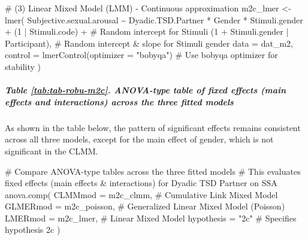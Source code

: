 \documentclass[
  bookmarksnumbered]{article}
\newenvironment{Shaded}{\begin{snugshade}}{\end{snugshade}}
\newcommand{\AttributeTok}[1]{\textcolor[rgb]{0.80,0.80,0.80}{#1}}
\newcommand{\CommentTok}[1]{\textcolor[rgb]{0.50,0.62,0.50}{#1}}
\newcommand{\DecValTok}[1]{\textcolor[rgb]{0.86,0.86,0.80}{#1}}
\newcommand{\FunctionTok}[1]{\textcolor[rgb]{0.94,0.94,0.56}{#1}}
\newcommand{\NormalTok}[1]{\textcolor[rgb]{0.80,0.80,0.80}{#1}}
\newcommand{\OtherTok}[1]{\textcolor[rgb]{0.94,0.94,0.56}{#1}}
\newcommand{\SpecialCharTok}[1]{\textcolor[rgb]{0.86,0.64,0.64}{#1}}
\newcommand{\StringTok}[1]{\textcolor[rgb]{0.80,0.58,0.58}{#1}}
\begin{document}
\begin{Shaded}
\begin{Highlighting}[]
\CommentTok{\# (3) Linear Mixed Model (LMM) {-} Continuous approximation}
\NormalTok{m2c\_lmer }\OtherTok{\textless{}{-}} \FunctionTok{lmer}\NormalTok{(}
\NormalTok{  Subjective.sexual.arousal }\SpecialCharTok{\textasciitilde{}}\NormalTok{ Dyadic.TSD.Partner }\SpecialCharTok{*}\NormalTok{ Gender }\SpecialCharTok{*}\NormalTok{ Stimuli.gender }\SpecialCharTok{+}
\NormalTok{    (}\DecValTok{1} \SpecialCharTok{|}\NormalTok{ Stimuli.code) }\SpecialCharTok{+} \CommentTok{\# Random intercept for Stimuli}
\NormalTok{    (}\DecValTok{1} \SpecialCharTok{+}\NormalTok{ Stimuli.gender }\SpecialCharTok{|}\NormalTok{ Participant), }\CommentTok{\# Random intercept \& slope for Stimuli gender}
  \AttributeTok{data =}\NormalTok{ dat\_m2,}
  \AttributeTok{control =} \FunctionTok{lmerControl}\NormalTok{(}\AttributeTok{optimizer =} \StringTok{"bobyqa"}\NormalTok{) }\CommentTok{\# Use \textquotesingle{}bobyqa\textquotesingle{} optimizer for stability}
\NormalTok{)}
\end{Highlighting}
\end{Shaded}

\subparagraph{Table \ref{tab:tab-robu-m2c}. ANOVA-type table of fixed effects (main effects and interactions) across the three fitted models}\label{table-reftabtab-robu-m2c.-anova-type-table-of-fixed-effects-main-effects-and-interactions-across-the-three-fitted-models}

As shown in the table below, the pattern of significant effects remains consistent across all three models, except for the main effect of gender, which is not significant in the CLMM.

\begin{Shaded}
\begin{Highlighting}[]
\CommentTok{\# Compare ANOVA{-}type tables across the three fitted models}
\CommentTok{\# This evaluates fixed effects (main effects \& interactions) for Dyadic TSD Partner on SSA}
\FunctionTok{anova.comp}\NormalTok{(}
  \AttributeTok{CLMMmod =}\NormalTok{ m2c\_clmm, }\CommentTok{\# Cumulative Link Mixed Model}
  \AttributeTok{GLMERmod =}\NormalTok{ m2c\_poisson, }\CommentTok{\# Generalized Linear Mixed Model (Poisson)}
  \AttributeTok{LMERmod =}\NormalTok{ m2c\_lmer, }\CommentTok{\# Linear Mixed Model}
  \AttributeTok{hypothesis =} \StringTok{"2c"} \CommentTok{\# Specifies hypothesis 2c}
\NormalTok{)}
\end{Highlighting}
\end{Shaded}
\end{document}
